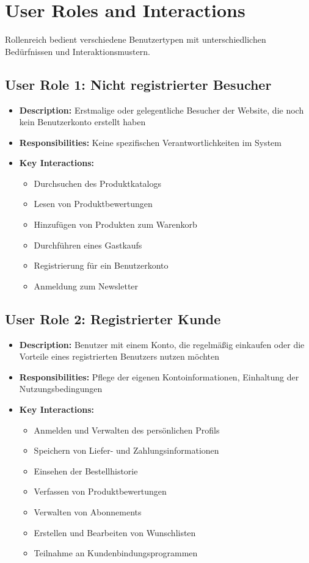 \documentclass[a4paper,11pt]{article}
\begin{document}
\section{User Roles and Interactions}
Rollenreich bedient verschiedene Benutzertypen mit unterschiedlichen Bedürfnissen und Interaktionsmustern.

\subsection{User Role 1: Nicht registrierter Besucher}
\begin{itemize}
    \item \textbf{Description:} Erstmalige oder gelegentliche Besucher der Website, die noch kein Benutzerkonto erstellt haben
    \item \textbf{Responsibilities:} Keine spezifischen Verantwortlichkeiten im System
    \item \textbf{Key Interactions:} 
    \begin{itemize}
        \item Durchsuchen des Produktkatalogs
        \item Lesen von Produktbewertungen
        \item Hinzufügen von Produkten zum Warenkorb
        \item Durchführen eines Gastkaufs
        \item Registrierung für ein Benutzerkonto
        \item Anmeldung zum Newsletter
    \end{itemize}
\end{itemize}

\subsection{User Role 2: Registrierter Kunde}
\begin{itemize}
    \item \textbf{Description:} Benutzer mit einem Konto, die regelmäßig einkaufen oder die Vorteile eines registrierten Benutzers nutzen möchten
    \item \textbf{Responsibilities:} Pflege der eigenen Kontoinformationen, Einhaltung der Nutzungsbedingungen
    \item \textbf{Key Interactions:} 
    \begin{itemize}
        \item Anmelden und Verwalten des persönlichen Profils
        \item Speichern von Liefer- und Zahlungsinformationen
        \item Einsehen der Bestellhistorie
        \item Verfassen von Produktbewertungen
        \item Verwalten von Abonnements
        \item Erstellen und Bearbeiten von Wunschlisten
        \item Teilnahme an Kundenbindungsprogrammen
    \end{itemize}
\end{itemize}
\end{document}
